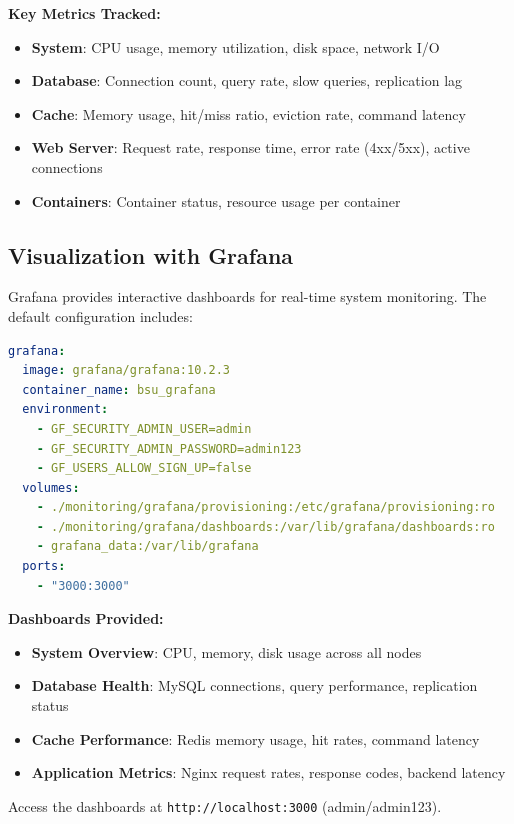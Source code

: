 \textbf{Key Metrics Tracked:}
\begin{itemize}
    \item \textbf{System}: CPU usage, memory utilization, disk space, network I/O
    \item \textbf{Database}: Connection count, query rate, slow queries, replication lag
    \item \textbf{Cache}: Memory usage, hit/miss ratio, eviction rate, command latency
    \item \textbf{Web Server}: Request rate, response time, error rate (4xx/5xx), active connections
    \item \textbf{Containers}: Container status, resource usage per container
\end{itemize}

\subsection{Visualization with Grafana}

Grafana provides interactive dashboards for real-time system monitoring. The default configuration includes:

\begin{lstlisting}[language=yaml, caption=Grafana Provisioning Configuration]
grafana:
  image: grafana/grafana:10.2.3
  container_name: bsu_grafana
  environment:
    - GF_SECURITY_ADMIN_USER=admin
    - GF_SECURITY_ADMIN_PASSWORD=admin123
    - GF_USERS_ALLOW_SIGN_UP=false
  volumes:
    - ./monitoring/grafana/provisioning:/etc/grafana/provisioning:ro
    - ./monitoring/grafana/dashboards:/var/lib/grafana/dashboards:ro
    - grafana_data:/var/lib/grafana
  ports:
    - "3000:3000"
\end{lstlisting}

\textbf{Dashboards Provided:}
\begin{itemize}
    \item \textbf{System Overview}: CPU, memory, disk usage across all nodes
    \item \textbf{Database Health}: MySQL connections, query performance, replication status
    \item \textbf{Cache Performance}: Redis memory usage, hit rates, command latency
    \item \textbf{Application Metrics}: Nginx request rates, response codes, backend latency
\end{itemize}

Access the dashboards at \texttt{http://localhost:3000} (admin/admin123).

